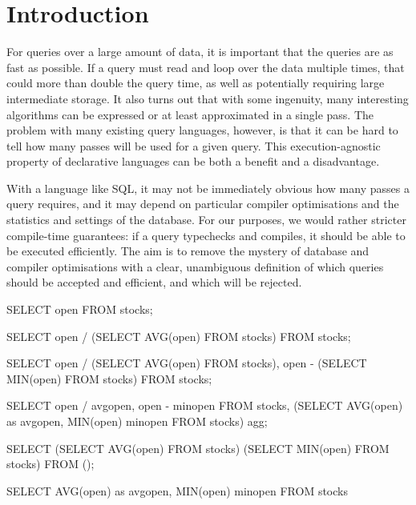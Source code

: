 \section{Introduction}
\label{s:Introduction}

For queries over a large amount of data, it is important that the queries are as fast as possible.
If a query must read and loop over the data multiple times, that could more than double the query time, as well as potentially requiring large intermediate storage.
It also turns out that with some ingenuity, many interesting algorithms can be expressed or at least approximated in a single pass.
The problem with many existing query languages, however, is that it can be hard to tell how many passes will be used for a given query.
This execution-agnostic property of declarative languages can be both a benefit and a disadvantage.

With a language like SQL, it may not be immediately obvious how many passes a query requires, and it may depend on particular compiler optimisations and the statistics and settings of the database.
For our purposes, we would rather stricter compile-time guarantees: if a query typechecks and compiles, it should be able to be executed efficiently.
The aim is to remove the mystery of database and compiler optimisations with a clear, unambiguous definition of which queries should be accepted and efficient, and which will be rejected.


\begin{code}
SELECT open FROM stocks;

SELECT open / (SELECT AVG(open) FROM stocks)
FROM stocks;

SELECT open / (SELECT AVG(open) FROM stocks),
       open - (SELECT MIN(open) FROM stocks)
FROM stocks;

SELECT open / avgopen, open - minopen
FROM stocks,
(SELECT AVG(open) as avgopen,
        MIN(open) minopen FROM stocks) agg;


SELECT (SELECT AVG(open) FROM stocks)
       (SELECT MIN(open) FROM stocks)
FROM ();

SELECT AVG(open) as avgopen,
       MIN(open) minopen FROM stocks
\end{code}

